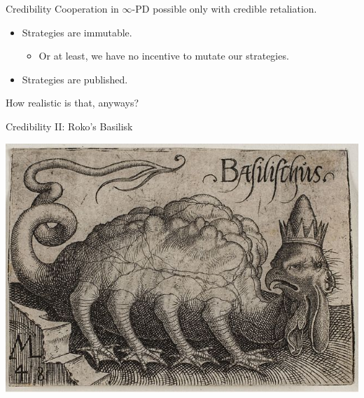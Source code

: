 \documentclass[pdf]{beamer}
\begin{document}
\begin{frame}{Credibility}
  Cooperation in $\infty$-PD possible only with credible retaliation.

  \pause
  \begin{itemize}
  \item Strategies are immutable.
    \begin{itemize}
    \item Or at  least, we have no incentive to mutate our strategies.
    \end{itemize}
  \item Strategies are published.
  \end{itemize}

  \pause
  How realistic is that, anyways?
\end{frame}

\begin{frame}{Credibility II: Roko's Basilisk}
  \begin{center}
    \includegraphics[scale=0.25]{basilisk.jpg}
  \end{center}
\end{frame}
\end{document}

